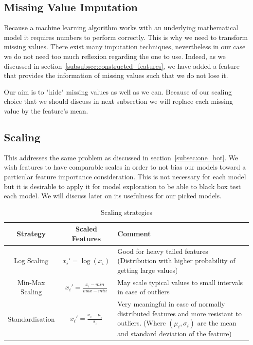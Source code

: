 \subsection{Missing Value Imputation}
Because a machine learning algorithm works with an underlying mathematical model it requires numbers to perform correctly. This is why we need to transform missing values. There exist many imputation techniques, nevertheless in our case we do not need too much reflexion regarding the one to use. Indeed, as we discussed in section~\ref{subsubsec:constructed_features}, we have added a feature that provides the information of missing values such that we do not lose it. 

Our aim is to "hide" missing values as well as we can. Because of our scaling choice that we should discuss in next subsection we will replace each missing value by the feature's mean.


\subsection{Scaling}
This addresses the same problem as discussed in section~\ref{subsec:one_hot}. We wish features to have comparable scales in order to not bias our models toward a particular feature importance consideration. This is not necessary for each model but it is desirable to apply it for model exploration to be able to black box test each model. We will discuss later on its usefulness for our picked models. 

\begin{table}[h]
\begin{center}
\begin{tabular}{c c p{80mm}}
\hline
\textbf{Strategy} & \textbf{Scaled Features} & \textbf{Comment} \\ 
\hline\hline
Log Scaling & $x_i'=\log(x_i)$ & Good for heavy tailed features (Distribution with higher probability of getting large values)\\
Min-Max Scaling & $x_i' = \frac{x_i - min}{max-min}$  & May scale typical values to small intervals in case of outliers\\
Standardisation & $x_i' = \frac{x_i - \mu_i}{\sigma_i}$ & Very meaningful in case of normally distributed features and more resistant to outliers. (Where $(\mu_i, \sigma_i)$ are the mean and standard deviation of the feature)
\end{tabular}
\end{center}
\caption{\label{scaling}Scaling strategies}
\end{table}

